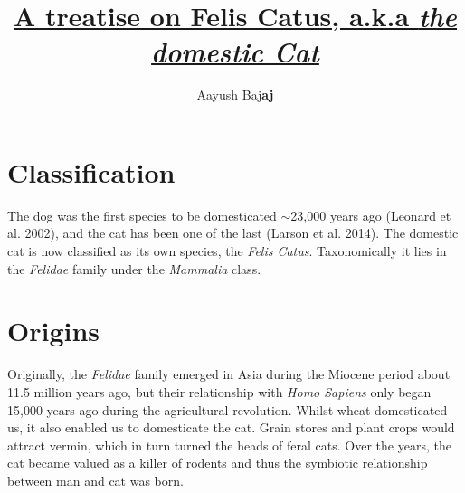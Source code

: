 \documentclass{article}
\title{\underline{A treatise on Felis Catus, a.k.a \emph{the domestic Cat}}}
\author{Aayush Baj\textbf{aj}}
\begin{document}
\maketitle{}

\pagestyle{fancy}
\dotfill

\section*{Classification}
The dog was the first species to be domesticated $\sim$23,000 years ago (Leonard et al. 2002), and the cat has been one of the last (Larson et al. 2014). The domestic cat is now classified as its own species, the \emph{Felis Catus}. Taxonomically it lies in the \emph{Felidae} family under the \emph{Mammalia} class.\\


\section*{Origins}
Originally, the \emph{Felidae} family emerged in Asia during the Miocene period about 11.5 million years ago, but their relationship with \emph{Homo Sapiens} only began 15,000 years ago during the agricultural revolution. Whilst wheat domesticated us, it also enabled us to domesticate the cat. Grain stores and plant crops would attract vermin, which in turn turned the heads of feral cats. Over the years, the cat became valued as a killer of rodents and thus the symbiotic relationship between man and cat was born. 
\end{document}
